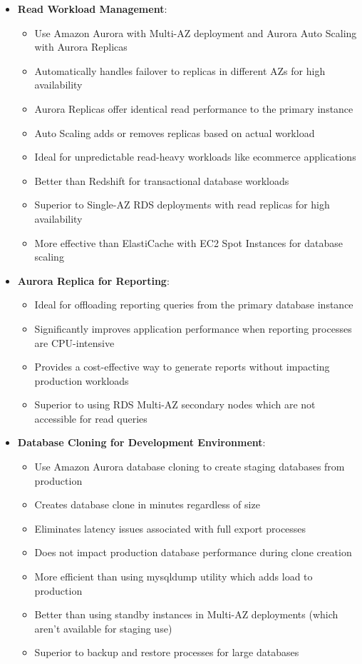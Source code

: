 \documentclass[11pt,a4paper]{report}
\begin{document}
\begin{itemize}
  \item \textbf{Read Workload Management}:
\begin{itemize}
  \item Use Amazon Aurora with Multi-AZ deployment and Aurora Auto Scaling with Aurora Replicas
  \item Automatically handles failover to replicas in different AZs for high availability
  \item Aurora Replicas offer identical read performance to the primary instance
  \item Auto Scaling adds or removes replicas based on actual workload
  \item Ideal for unpredictable read-heavy workloads like ecommerce applications
  \item Better than Redshift for transactional database workloads
  \item Superior to Single-AZ RDS deployments with read replicas for high availability
  \item More effective than ElastiCache with EC2 Spot Instances for database scaling
\end{itemize}
  \item \textbf{Aurora Replica for Reporting}:
\begin{itemize}
  \item Ideal for offloading reporting queries from the primary database instance
  \item Significantly improves application performance when reporting processes are CPU-intensive
  \item Provides a cost-effective way to generate reports without impacting production workloads
  \item Superior to using RDS Multi-AZ secondary nodes which are not accessible for read queries
\end{itemize}
  \item \textbf{Database Cloning for Development Environment}:
\begin{itemize}
  \item Use Amazon Aurora database cloning to create staging databases from production
  \item Creates database clone in minutes regardless of size
  \item Eliminates latency issues associated with full export processes
  \item Does not impact production database performance during clone creation
  \item More efficient than using mysqldump utility which adds load to production
  \item Better than using standby instances in Multi-AZ deployments (which aren't available for staging use)
  \item Superior to backup and restore processes for large databases
\end{itemize}
\end{itemize}
\end{document}
